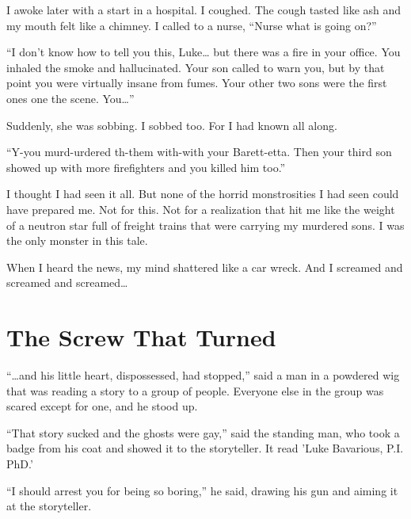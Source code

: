I awoke later with a start in a hospital. I coughed. The cough
tasted like ash and my mouth felt like a chimney. I called to a
nurse, ``Nurse what is going on?''



``I don't know how to tell you this, Luke{\ldots} but
there was a fire in your office. You inhaled the smoke and
hallucinated. Your son called to warn you, but by that point you
were virtually insane from fumes. Your other two sons were the
first ones one the scene. You{\ldots}''



Suddenly, she was sobbing. I sobbed too. For I had known all
along.



``Y-you murd-urdered th-them with-with your Barett-etta. Then
your third son showed up with more firefighters and you killed him
too.''



I thought I had seen it all. But none of the horrid monstrosities I
had seen could have prepared me. Not for this. Not for a
realization that hit me like the weight of a neutron star full of
freight trains that were carrying my murdered sons. I was the only
monster in this tale.



When I heard the news, my mind shattered like a car wreck. And I
screamed and screamed and screamed{\ldots}


 





\chapter{The Screw That Turned}


``{\ldots}and his little heart, dispossessed, had stopped,'' said a man in
a powdered wig that was reading a story to a group of people.
Everyone else in the group was scared except for one, and he stood
up.



``That story sucked and the ghosts were gay,'' said the standing man,
who took a badge from his coat and showed it to the storyteller. It
read 'Luke Bavarious, P.I. PhD.'



``I should arrest you for being so boring,'' he said, drawing his gun
and aiming it at the storyteller.



